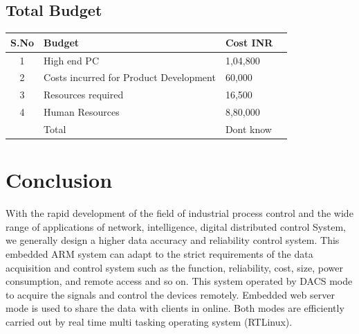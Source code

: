 \documentclass{FR16}
\begin{document}
\subsection{Total Budget}
\begin{center}
\begin{tabular}{||c ||p{6 cm}|| p{3 cm}|| c|| }
\arrayrulecolor{Azzurro}
\hline
\hline
{\bfseries S.No} & {\bfseries Budget}&  {\bfseries Cost INR} \\
\hline
\hline

1& High end PC& 1,04,800\\
\hline
\hline
2& Costs incurred for Product Development & 60,000\\
\hline
\hline
3&Resources required &16,500\\
\hline
\hline
4&Human Resources & 8,80,000\\
\hline
\hline
& Total & Dont know
\end{tabular}
\end{center}





\section{Conclusion}
With the rapid development of the field of industrial process control and the wide range of applications of network, intelligence, digital distributed control System, we generally design a higher data accuracy and
reliability  control system. This embedded ARM system can adapt to the strict requirements of the data acquisition and control system such as the function, reliability, cost, size, power consumption, and remote access
and so on. This system operated by DACS mode to acquire the signals and control the devices remotely. Embedded web server mode is used to share the data with clients in online. Both modes are efficiently carried out by real time multi tasking operating system (RTLinux). 














\newpage
\end{document}

